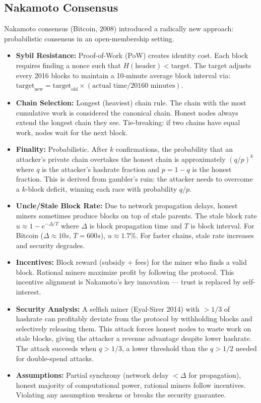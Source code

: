 \subsection{Nakamoto Consensus}
\label{sec:consensus:nakamoto}

Nakamoto consensus (Bitcoin, 2008) introduced a radically new approach: probabilistic consensus in an open-membership setting.

\begin{itemize}
\item \textbf{Sybil Resistance:} Proof-of-Work (PoW) creates identity cost. Each block requires finding a nonce such that $H(\text{header}) < \text{target}$. The target adjusts every 2016 blocks to maintain a 10-minute average block interval via: $\text{target}_{\text{new}} = \text{target}_{\text{old}} \times (\text{actual time} / 20160 \text{ minutes})$.
\item \textbf{Chain Selection:} Longest (heaviest) chain rule. The chain with the most cumulative work is considered the canonical chain. Honest nodes always extend the longest chain they see. Tie-breaking: if two chains have equal work, nodes wait for the next block.
\item \textbf{Finality:} Probabilistic. After $k$ confirmations, the probability that an attacker's private chain overtakes the honest chain is approximately $(q/p)^k$ where $q$ is the attacker's hashrate fraction and $p = 1 - q$ is the honest fraction. This is derived from gambler's ruin: the attacker needs to overcome a $k$-block deficit, winning each race with probability $q/p$.
\item \textbf{Uncle/Stale Block Rate:} Due to network propagation delays, honest miners sometimes produce blocks on top of stale parents. The stale block rate $u \approx 1 - e^{-\Delta/T}$ where $\Delta$ is block propagation time and $T$ is block interval. For Bitcoin ($\Delta \approx 10s$, $T = 600s$), $u \approx 1.7\%$. For faster chains, stale rate increases and security degrades.
\item \textbf{Incentives:} Block reward (subsidy + fees) for the miner who finds a valid block. Rational miners maximize profit by following the protocol. This incentive alignment is Nakamoto's key innovation — trust is replaced by self-interest.
\item \textbf{Security Analysis:} A selfish miner (Eyal-Sirer 2014) with $> 1/3$ of hashrate can profitably deviate from the protocol by withholding blocks and selectively releasing them. This attack forces honest nodes to waste work on stale blocks, giving the attacker a revenue advantage despite lower hashrate. The attack succeeds when $q > 1/3$, a lower threshold than the $q > 1/2$ needed for double-spend attacks.
\item \textbf{Assumptions:} Partial synchrony (network delay $< \Delta$ for propagation), honest majority of computational power, rational miners follow incentives. Violating any assumption weakens or breaks the security guarantee.
\end{itemize}

